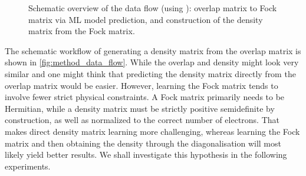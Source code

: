 \begin{figure}[H]
    \caption[Schematic overview data flow]{Schematic overview of the data flow (using ): overlap matrix to Fock matrix via ML model prediction, and construction of the density matrix from the Fock matrix.}
    \label{fig:method_data_flow}
\end{figure}

The schematic workflow of generating a density matrix from the overlap matrix is shown in \autoref{fig:method_data_flow}. While the overlap and density might look very similar and one might think that predicting the density matrix directly from the overlap matrix would be easier. However, learning the Fock matrix tends to involve fewer strict physical constraints. A Fock matrix primarily needs to be Hermitian, while a density matrix must be strictly positive semidefinite by construction, as well as normalized to the correct number of electrons. That makes direct density matrix learning more challenging, whereas learning the Fock matrix and then obtaining the density through the diagonalisation will most likely yield better results. We shall investigate this hypothesis in the following experiments.\\

